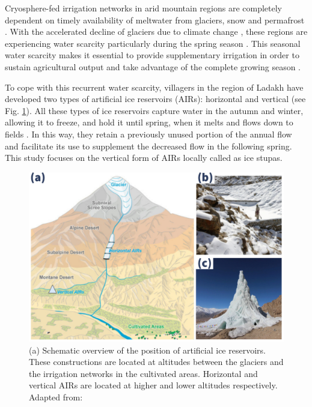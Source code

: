 \documentclass[tc, manuscript]{copernicus}
\begin{document}
\introduction

Cryosphere-fed irrigation networks in arid mountain regions are completely dependent on timely availability of
meltwater from glaciers, snow and permafrost \citep{immerzeelImportanceVulnerabilityWorld2020, farhanHydrologicalRegimesConjunction2015,
tveitenGlacierGrowingLocal2007}. With the accelerated decline of glaciers due to climate change
\citep{nusserLocalKnowledgeGlobal2016}, these regions are experiencing water scarcity particularly during the
spring season \citep{norphelSnowWaterHarvesting2015}. This seasonal water scarcity makes it essential to provide
supplementary irrigation in order to sustain agricultural output and take advantage of the complete growing
season \citep{nusserLocalKnowledgeGlobal2016, vincentEnergyClimateChange2009}.

To cope with this recurrent water scarcity, villagers in the region of Ladakh have developed two types of
artificial ice reservoirs (AIRs): horizontal and vertical (see Fig. \ref{fig:AIRforms}).  All these types of ice
reservoirs capture water in the autumn and winter, allowing it to freeze, and hold it until spring, when it
melts and flows down to fields \citep{ipccChapterHighMountain2019, vinceGlacierMan2009,
clouseLadakhArtificialGlaciers2017, nusserSociohydrologyArtificialGlaciers2019}. In this way, they retain a
previously unused portion of the annual flow and facilitate its use to supplement the decreased flow in the
following spring. This study focuses on the vertical form of AIRs locally called as ice stupas.

\begin{figure}[t]
\includegraphics[width=12cm]{Figures/AIR_forms.jpg}

\caption{(a) Schematic overview of the position of artificial ice reservoirs. These constructions are located at
altitudes between the glaciers and the irrigation networks in the cultivated areas. Horizontal and vertical AIRs
are located at higher and lower altitudes respectively. Adapted from: \cite{nusserLocalKnowledgeGlobal2016}}

\label{fig:AIRforms}
\end{figure}
\end{document}
